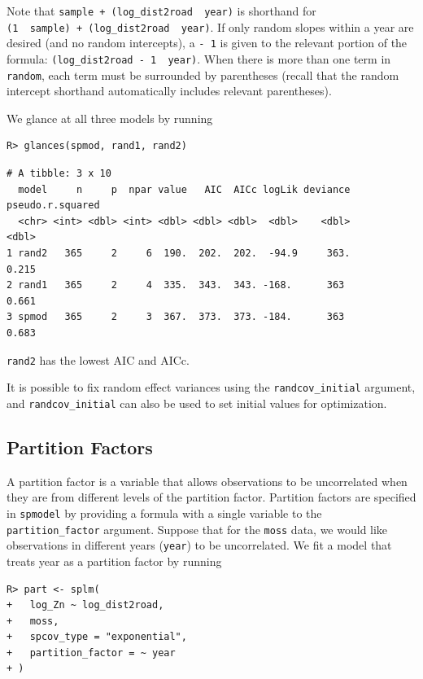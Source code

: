 \documentclass[10pt,letterpaper]{article}
\begin{document}
Note that \texttt{sample\ +\ (log\_dist2road\ \textbar{}\ year)} is
shorthand for
\texttt{(1\ \textbar{}\ sample)\ +\ (log\_dist2road\ \textbar{}\ year)}.
If only random slopes within a year are desired (and no random
intercepts), a \texttt{-\ 1} is given to the relevant portion of the
formula: \texttt{(log\_dist2road\ -\ 1\ \textbar{}\ year)}. When there
is more than one term in \texttt{random}, each term must be surrounded
by parentheses (recall that the random intercept shorthand automatically
includes relevant parentheses).

We glance at all three models by running

\begin{verbatim}
R> glances(spmod, rand1, rand2)
\end{verbatim}

\begin{verbatim}
# A tibble: 3 x 10
  model     n     p  npar value   AIC  AICc logLik deviance pseudo.r.squared
  <chr> <int> <dbl> <int> <dbl> <dbl> <dbl>  <dbl>    <dbl>            <dbl>
1 rand2   365     2     6  190.  202.  202.  -94.9     363.            0.215
2 rand1   365     2     4  335.  343.  343. -168.      363             0.661
3 spmod   365     2     3  367.  373.  373. -184.      363             0.683
\end{verbatim}

\texttt{rand2} has the lowest AIC and AICc.

It is possible to fix random effect variances using the
\texttt{randcov\_initial} argument, and \texttt{randcov\_initial} can
also be used to set initial values for optimization.

\hypertarget{partition-factors}{%
\subsection{Partition Factors}\label{partition-factors}}

A partition factor is a variable that allows observations to be
uncorrelated when they are from different levels of the partition
factor. Partition factors are specified in \texttt{spmodel} by providing
a formula with a single variable to the \texttt{partition\_factor}
argument. Suppose that for the \texttt{moss} data, we would like
observations in different years (\texttt{year}) to be uncorrelated. We
fit a model that treats year as a partition factor by running

\begin{verbatim}
R> part <- splm(
+   log_Zn ~ log_dist2road,
+   moss,
+   spcov_type = "exponential",
+   partition_factor = ~ year
+ )
\end{verbatim}
\end{document}
